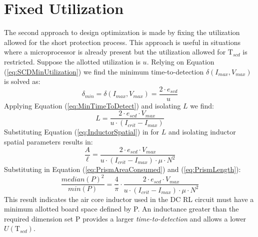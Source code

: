 \documentclass[11pt,compsoc,oneside]{report}
\begin{document}
\section{Fixed Utilization}
The second approach to design optimization is made by fixing the utilization allowed for the short protection process. This approach is useful in situations where a microprocessor is already present but the utilization allowed for $\mathrm{T}_{scd}$ is restricted. Suppose the allotted utilization is $u$. Relying on Equation (\ref{eq:SCDMinUtilization}) we find the minimum time-to-detection $\delta(I_{max},V_{max})$ is solved as:
\begin{equation}\label{eq:MinTimeToDetectSpatial}
\delta_{min} = \delta(I_{max},V_{max}) = \frac{2 \cdot e_{scd}}{u} \nonumber
\end{equation}
Applying Equation (\ref{eq:MinTimeToDetect}) and isolating $L$ we find:
\begin{equation}\label{eq:InductorFixedUtilization}
L = \frac{2 \cdot e_{scd} \cdot V_{max}}{u \cdot (I_{crit}-I_{max})} \nonumber
\end{equation}
Substituting Equation (\ref{eq:InductorSpatial}) in for $L$ 
and isolating inductor spatial parameters results in:
\begin{equation}\label{eq:MrinPrismUtilizationUnsolved2}
\frac{A}{\ell} = \frac{2 \cdot e_{scd} \cdot V_{max}}{u \cdot (I_{crit}-I_{max}) \cdot \mu \cdot N^{2}} \nonumber
\end{equation}
Substituting in Equation (\ref{eq:PrismAreaConsumed}) and (\ref{eq:PrismLength}):
\begin{equation}\label{eq:MinPrismUtilization}
\frac{median(P)^{2}}{min(P)} = \frac{4}{\pi} \cdot \frac{ 2 \cdot e_{scd} \cdot V_{max}}{u \cdot (I_{crit}-I_{max}) \cdot \mu \cdot N^{2}}
\end{equation}
This result indicates the air core inductor used in the DC RL circuit must have a minimum allotted board space defined by P. An inductance greater than the required dimension set P provides a larger \textit{time-to-detection} and allows a lower $U(\mathrm{T}_{scd})$.
\end{document}
